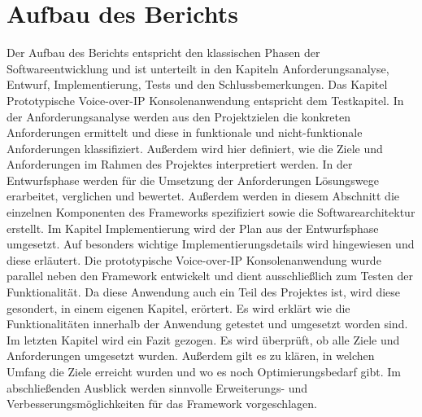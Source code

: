 \section{Aufbau des Berichts}
Der Aufbau des Berichts entspricht den klassischen Phasen der Softwareentwicklung und ist unterteilt in den Kapiteln Anforderungsanalyse, Entwurf, Implementierung, Tests und den Schlussbemerkungen. Das Kapitel Prototypische Voice-over-IP Konsolenanwendung entspricht dem Testkapitel. 
In der Anforderungsanalyse werden aus den Projektzielen die konkreten Anforderungen ermittelt und diese in funktionale und nicht-funktionale Anforderungen klassifiziert. Außerdem wird hier definiert, wie die Ziele und Anforderungen im Rahmen des Projektes interpretiert werden.
In der Entwurfsphase werden für die Umsetzung der Anforderungen Lösungswege erarbeitet, verglichen und bewertet. Außerdem werden in diesem Abschnitt die einzelnen Komponenten des Frameworks spezifiziert sowie die Softwarearchitektur erstellt.
Im Kapitel Implementierung wird der Plan aus der Entwurfsphase umgesetzt. Auf besonders wichtige Implementierungsdetails wird hingewiesen und diese erläutert. 
Die prototypische Voice-over-IP Konsolenanwendung wurde parallel neben den Framework entwickelt und dient ausschließlich zum Testen der Funktionalität. Da diese Anwendung auch ein Teil des Projektes ist, wird diese gesondert, in einem eigenen Kapitel, erörtert. Es wird erklärt wie die Funktionalitäten innerhalb der Anwendung getestet und umgesetzt worden sind.
Im letzten Kapitel wird ein Fazit gezogen. Es wird überprüft, ob alle Ziele und Anforderungen umgesetzt wurden. Außerdem gilt es zu klären, in welchen Umfang die Ziele erreicht wurden und wo es noch Optimierungsbedarf gibt. Im abschließenden Ausblick werden sinnvolle Erweiterungs- und Verbesserungsmöglichkeiten für das Framework vorgeschlagen.
	
